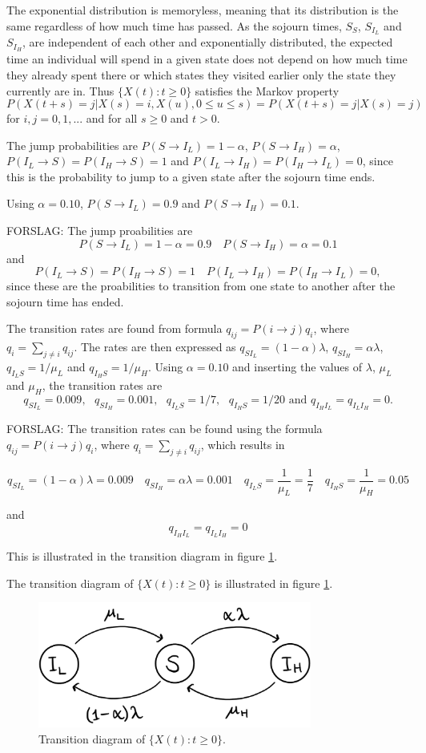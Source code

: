 
The exponential distribution is memoryless, meaning that its distribution is the same regardless of how much time has passed. As the sojourn times, $S_S$, $S_{I_L}$ and $S_{I_H}$, are independent of each other and exponentially distributed, the expected time an individual will spend in a given state does not depend on how much time they already spent there or which states they visited earlier only the state they currently are in. Thus $\{X(t):t \geq 0 \}$  satisfies the Markov property
$$P(X(t+s)=j|X(s)=i, X(u), 0 \leq u \leq s)=P(X(t+s)=j|X(s)=j)$$ 
for $i,j = 0,1,...$ and for all $s \geq 0$ and $t >0 $.

The jump probabilities are $P(S \rightarrow I_L)= 1 - \alpha$, $P(S \rightarrow I_H)= \alpha$, $P(I_L \rightarrow S)= P(I_H \rightarrow S) = 1$ and $P(I_L \rightarrow I_H)= P(I_H \rightarrow I_L) = 0$, since this is the probability to jump to a given state after the sojourn time ends.

Using $\alpha = 0.10$, $P(S \rightarrow I_L)= 0.9$ and $P(S \rightarrow I_H)= 0.1$. 

FORSLAG:
The jump proabilities are 
$$P(S \rightarrow I_L)= 1 - \alpha = 0.9 \quad P(S \rightarrow I_H)= \alpha = 0.1$$ 
and
$$P(I_L \rightarrow S)= P(I_H \rightarrow S) = 1 \quad P(I_L \rightarrow I_H)= P(I_H \rightarrow I_L) = 0,$$ 
since these are the proabilities to transition from one state to another after the sojourn time has ended.

The transition rates are found from formula $q_{ij} = P(i \rightarrow j ) q_i$, where $q_i = \sum_{j \neq i} q_{ij}$. The rates are then expressed as $q_{SI_L} = (1-\alpha)\lambda $, $q_{SI_H} = \alpha \lambda$, $q_{I_LS} = 1/\mu_L$ and $q_{I_HS} = 1/\mu_H$. Using $\alpha = 0.10$ and inserting the values of $\lambda$, $\mu_L$ and $\mu_H$, the transition rates are 
$$q_{SI_L} = 0.009,\text{ } q_{SI_H} = 0.001, \text{ } q_{I_LS} = 1/7, \text{ } q_{I_HS} = 1/20 \text{ and } q_{I_HI_L}=q_{I_LI_H}=0.$$

FORSLAG: The transition rates can be found using the formula $q_{ij} = P(i \rightarrow j ) q_i$, where $q_i = \sum_{j \neq i} q_{ij}$, which results in

$$q_{SI_L} = (1-\alpha)\lambda = 0.009 \quad q_{SI_H} = \alpha \lambda = 0.001 \quad q_{I_LS} = \frac{1}{\mu_L} = \frac17  \quad q_{I_HS} = \frac{1}{\mu_H} = 0.05 $$

and
$$ q_{I_HI_L}=q_{I_LI_H}=0 $$

This is illustrated in the transition diagram in figure \ref{transdiagramA}.




The transition diagram of $\{X(t):t \geq 0 \}$ is illustrated in figure \ref{transdiagramA}. 

\begin{figure}
    \centering
    \includegraphics[width=90mm]{TransDiag1A.png}
    \caption{Transition diagram of $\{X(t):t\geq0\}$.}
    \label{transdiagramA}
\end{figure}




